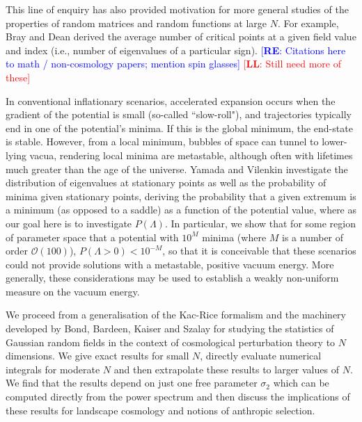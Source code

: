 \documentclass[12pt]{article}
\newcommand{\re}[1]{\textcolor{blue}{[{\bf RE}: #1]}}
\newcommand{\lfl}[1]{\textcolor{red}{[{\bf LL}: #1]}}
\begin{document}
This line of enquiry has also provided motivation for more general studies of the properties of random matrices and random functions at large $N$. For example,  Bray and Dean derived the average number of critical points at a given field value and index (i.e., number of eigenvalues of a particular sign).\cite{Bray2007,Dean2008,Majumdar2009,Bachlechner2014,Battefeld2012,Fyodorov2013,Masoumi2017} \re{Citations here to math / non-cosmology papers; mention spin glasses} \lfl{Still need more of these}


In conventional inflationary scenarios, accelerated expansion occurs when the gradient of the potential is small (so-called ``slow-roll"), and trajectories typically end in one of the potential's minima. If this is the global minimum, the end-state is stable. However, from  a local minimum, bubbles of space can tunnel to lower-lying vacua, rendering local minima are metastable, although often with lifetimes much greater than the age of the universe.  Yamada and Vilenkin \cite{Yamada2018} investigate the distribution of eigenvalues at stationary points as well as the probability of minima given stationary points, deriving the probability that a given extremum is a minimum (as opposed to a saddle) as a function of the potential value, where as our goal here is to investigate $P(\Lambda)$. In particular, we show that for some region of parameter space that a potential with $10^M$ minima (where $M$ is a number of order $\mathcal{O}(100)$), $P(\Lambda > 0) < 10^{-M}$, so that it is conceivable that these scenarios could not provide solutions with a metastable, positive vacuum energy. More generally, these considerations may be used to establish a weakly non-uniform measure on the vacuum energy. 

We proceed from a generalisation of the Kac-Rice formalism \cite{Kac1943,Rice1945} and the  machinery developed by Bond, Bardeen, Kaiser and Szalay  \cite{BBKS}  for studying the statistics of Gaussian random fields in the context of cosmological perturbation theory   to $N$ dimensions. We give exact results for small $N$, directly evaluate numerical integrals for moderate $N$ and then extrapolate these results to larger values of $N$. We find that the results depend on just one free parameter $\sigma_2$ which can be computed directly from the power spectrum and then discuss the implications of these results for landscape cosmology and notions of anthropic selection. 
\end{document}
